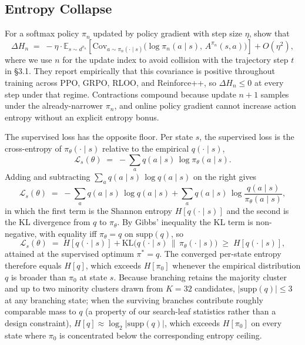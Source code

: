 \documentclass[11pt]{article}
\begin{document}
\subsection{Entropy Collapse}
\label{app:rl:entropy}

For a softmax policy $\pi_n$ updated by policy gradient with step size
$\eta$, \citet{cui2025entropy} show that
\[
    \Delta H_n
    \;=\; -\eta \cdot \mathbb{E}_{s \sim d^{\pi_n}}\!\left[
        \mathrm{Cov}_{a \sim \pi_n(\cdot \mid s)}\bigl(\log \pi_n(a \mid s),\, A^{\pi_n}(s, a)\bigr)
      \right] + O(\eta^2),
\]
where we use $n$ for the update index to avoid collision with the
trajectory step $t$ in \S3.1. They report empirically that this
covariance is positive throughout training across PPO, GRPO, RLOO, and
Reinforce++, so $\Delta H_n \le 0$ at every step under that regime.
Contractions compound because update $n+1$ samples under the
already-narrower $\pi_n$, and online policy gradient cannot increase
action entropy without an explicit entropy bonus.

The supervised loss has the opposite floor. Per state $s$, the
supervised loss is the cross-entropy of $\pi_\theta(\cdot \mid s)$
relative to the empirical $q(\cdot \mid s)$,
\[
    \mathcal{L}_s(\theta)
    \;=\; -\sum_{a} q(a \mid s)\,\log \pi_\theta(a \mid s).
\]
Adding and subtracting $\sum_a q(a \mid s)\,\log q(a \mid s)$ on the
right gives
\[
    \mathcal{L}_s(\theta)
    \;=\; -\sum_a q(a \mid s)\,\log q(a \mid s)
        + \sum_a q(a \mid s)\,\log \frac{q(a \mid s)}{\pi_\theta(a \mid s)},
\]
in which the first term is the Shannon entropy $H[q(\cdot \mid s)]$ and
the second is the KL divergence from $q$ to $\pi_\theta$.
By Gibbs' inequality the KL term is non-negative, with equality iff
$\pi_\theta = q$ on $\mathrm{supp}(q)$, so
\[
    \mathcal{L}_s(\theta)
    \;=\; H[q(\cdot \mid s)] + \mathrm{KL}\bigl(q(\cdot \mid s)\,\big\|\,\pi_\theta(\cdot \mid s)\bigr)
    \;\ge\; H[q(\cdot \mid s)],
\]
attained at the supervised optimum $\pi^* = q$. The converged per-state
entropy therefore equals $H[q]$, which exceeds $H[\pi_0]$ whenever the
empirical distribution $q$ is broader than $\pi_0$ at state $s$. Because
branching retains the majority cluster and up to two minority clusters
drawn from $K = 32$ candidates, $|\mathrm{supp}(q)| \le 3$ at any
branching state; when the surviving branches contribute roughly
comparable mass to $q$ (a property of our search-leaf statistics rather
than a design constraint), $H[q] \approx \log_2 |\mathrm{supp}(q)|$,
which exceeds $H[\pi_0]$ on every state where $\pi_0$ is concentrated
below the corresponding entropy ceiling.
\end{document}
